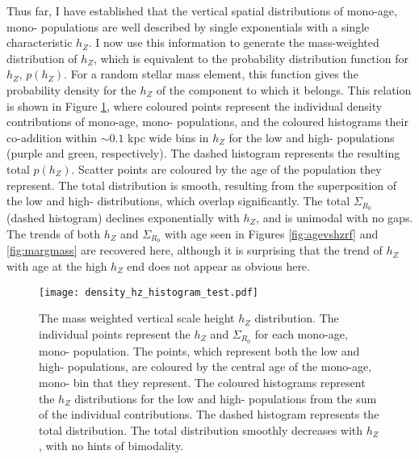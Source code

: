 Thus far, I have established that the vertical spatial distributions of mono-age, mono-\feh{} populations are well described by single exponentials with a single characteristic $h_Z$. I now use this information to generate the mass-weighted distribution of $h_Z$, which is equivalent to the probability distribution function for $h_Z$, $p(h_Z)$. For a random stellar mass element, this function gives the probability density for the $h_Z$ of the component to which it belongs.  This relation is shown in Figure \ref{fig:hzhistogram}, where coloured points represent the individual density contributions of mono-age, mono-\feh{} populations, and the coloured histograms their co-addition within $\sim 0.1$ kpc wide bins in $h_Z$ for the low and high-\afe{} populations (purple and green, respectively). The dashed histogram represents the resulting total $p(h_Z)$. Scatter points are coloured by the age of the population they represent. The total distribution is smooth, resulting from the superposition of the low and high-\afe{} distributions, which overlap significantly.  The total $\Sigma_{R_0}$ (dashed histogram) declines exponentially with $h_Z$, and is unimodal with no gaps. The trends of both $h_Z$ and $\Sigma_{R_0}$ with age seen in Figures \ref{fig:agevshzrf} and \ref{fig:margmass} are recovered here, although it is surprising that the trend of $h_Z$ with age at the high $h_Z$ end does not appear as obvious here.

 \begin{figure}
	\texttt{[image: density\_hz\_histogram\_test.pdf]}
 	\centering
     \caption[The mass weighted vertical scale height distribution as calculated using mono-age, mono-\feh{} populations in APOGEE DR12]{The mass weighted vertical scale height $h_Z$ distribution. The individual points represent the $h_Z$ and $\Sigma_{R_0}$ for each mono-age, mono-\feh{} population. The points, which represent both the low and high-\afe{} populations, are coloured by the central age of the mono-age, mono-\feh{} bin that they represent. The coloured histograms represent the $h_Z$ distributions for the low and high-\afe{} populations from the sum of the individual contributions. The dashed histogram represents the total distribution. The total distribution smoothly decreases with $h_Z$, with no hints of bimodality.}
     \label{fig:hzhistogram}
 \end{figure}


